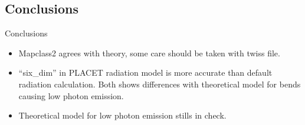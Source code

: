 \documentclass{beamer}
\begin{document}
\subsection{Conclusions}
\begin{frame}{Conclusions}
\begin{itemize}
 \item Mapclass2 agrees with theory, some care should be taken with twiss file.
 \item ``six\_dim'' in PLACET radiation model is more accurate than default radiation calculation. Both shows differences with theoretical model for bends causing low photon emission.
 \item Theoretical model for low photon emission stills in check.

\end{itemize}

\end{frame}
\end{document}
